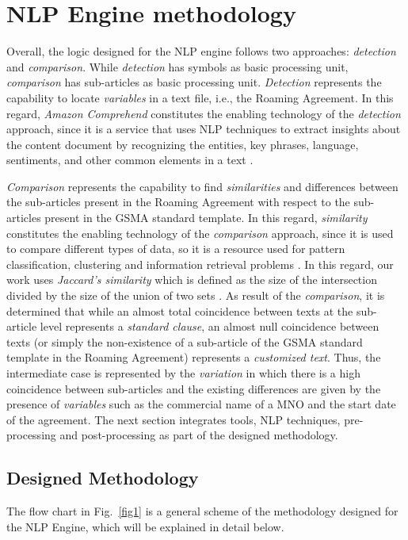 \documentclass[conference]{style/IEEEtran}
\begin{document}
\section{NLP Engine methodology}
Overall, the logic designed for the NLP engine follows two approaches: \textit{detection} and \textit{comparison}. While \textit{detection} has symbols as basic processing unit, \textit{comparison} has sub-articles as basic processing unit. \textit{Detection} represents the capability to locate \textit{variables} in a text file, i.e., the Roaming Agreement. In this regard, \textit{Amazon Comprehend} constitutes the enabling technology of the \textit{detection} approach, since it is a service that uses NLP techniques to extract insights about the content document by recognizing  the  entities,  key  phrases,  language,  sentiments,  and  other  common  elements  in  a  text \cite{AWS2021}.

\textit{Comparison} represents the capability to find \textit{similarities} and differences between the sub-articles present in the Roaming Agreement with respect to the sub-articles present in the GSMA standard template. In this regard, \textit{similarity} constitutes the enabling technology of the \textit{comparison} approach, since it is used to compare different types of data, so it is a resource used for pattern classification, clustering and information retrieval problems \cite{7429408}. In this regard, our work uses  \textit{Jaccard's similarity} which is defined as the size of the intersection divided by the size of the union of two sets \cite{Gupta2018}. As result of the \textit{comparison}, it is determined that while an almost total coincidence between texts at the sub-article level represents a \textit{standard clause}, an almost null coincidence between texts (or simply the non-existence of a sub-article of the GSMA standard template in the Roaming Agreement) represents a \textit{customized text}. Thus, the intermediate case is represented by the \textit{variation} in which there is a high coincidence between sub-articles and the existing differences are given by the presence of \textit{variables} such as the commercial name of a MNO and the start date of the agreement. The next section integrates tools, NLP techniques, pre-processing and post-processing as part of the designed methodology.

\subsection{Designed Methodology}
The flow chart in Fig.~\ref{fig1} is a general scheme of the methodology designed for the NLP Engine, which will be explained in detail below.
\end{document}
